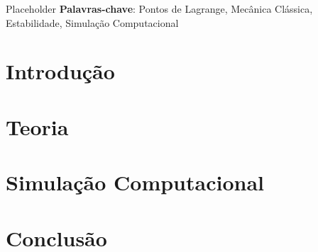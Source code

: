 \documentclass[10pt,twoside,a4paper,brazil]{abntex2}
\begin{document}
   \imprimircapa
   \imprimirfolhaderosto
   \tableofcontents

   \begin{resumo}
      Placeholder
      \vspace{\onelineskip}
      \noindent
      \textbf{Palavras-chave}: Pontos de Lagrange, Mecânica Clássica, Estabilidade, Simulação Computacional
   \end{resumo}

   \chapter{Introdução}
      
      
   \chapter{Teoria}
      
     
   \chapter{Simulação Computacional}
      

   \chapter{Conclusão}
      

   
\end{document}
